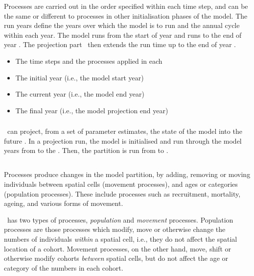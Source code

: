 Processes are carried out in the order specified within each time step, and can be the same or different to processes in other initialisation phases of the model. The run years define the years over which the model is to run and the annual cycle within each year. The model runs from the start of year  and runs to the end of year . The projection part \NYI\ then extends the run time up to the end of year . 

\begin{itemize}
  \item The time steps and the processes applied in each
  \item The initial year (i.e., the model start year)
  \item The current year (i.e., the model end year)
  \item The final year (i.e., the model projection end year)
\end{itemize}

\subsubsection{\label{sec:projections}}

\SPM\ can project, from a set of parameter estimates, the state of the model into the future \NYI. In a projection run, the model is initialised and run through the model years from  to the . Then, the partition is run from  to . 

\subsection{}

Processes produce changes in the model partition, by adding, removing or moving individuals between spatial cells (movement processes), and ages or categories (population processes). These include processes such as recruitment, mortality, ageing, and various forms of movement.

\SPM\ has two types of processes, \emph{population} and \emph{movement} processes. Population processes are those processes which modify, move or otherwise change the numbers of individuals \emph{within} a spatial cell, i.e., they do not affect the spatial location of a cohort. Movement processes, on the other hand, move, shift or otherwise modify cohorts \emph{between} spatial cells, but do not affect the age or category of the numbers in each cohort. 

